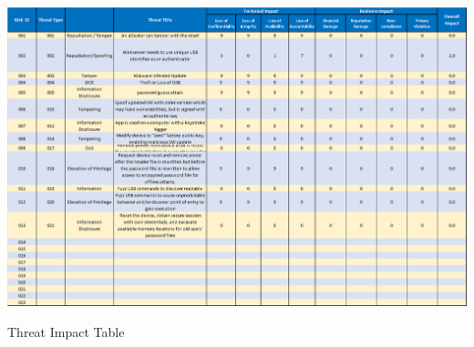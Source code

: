 \begin{table}
    \includegraphics[]{owasp_impact}
    \caption{Threat Impact Table}
    \label{tab:impact}
\end{table}




